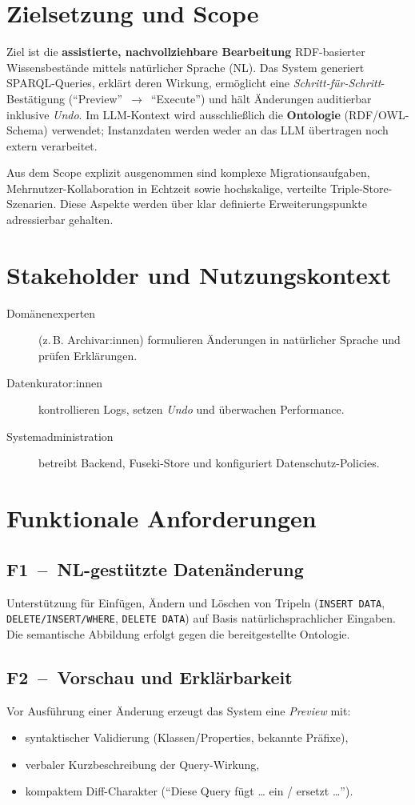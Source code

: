 \section{Zielsetzung und Scope}
Ziel ist die \textbf{assistierte, nachvollziehbare Bearbeitung} RDF-basierter Wissensbestände mittels natürlicher Sprache (NL). Das System generiert SPARQL-Queries, erklärt deren Wirkung, ermöglicht eine \emph{Schritt-für-Schritt}-Bestätigung (\enquote{Preview}~$\rightarrow$~\enquote{Execute}) und hält Änderungen auditierbar inklusive \emph{Undo}. Im LLM-Kontext wird ausschließlich die \textbf{Ontologie} (RDF/OWL-Schema) verwendet; Instanzdaten werden weder an das LLM übertragen noch extern verarbeitet.

Aus dem Scope explizit ausgenommen sind komplexe Migrationsaufgaben, Mehrnutzer-Kollaboration in Echtzeit sowie hochskalige, verteilte Triple-Store-Szenarien. Diese Aspekte werden über klar definierte Erweiterungspunkte adressierbar gehalten.

\section{Stakeholder und Nutzungskontext}
\begin{description}
  \item[Domänenexperten] (z.\,B. Archivar:innen) formulieren Änderungen in natürlicher Sprache und prüfen Erklärungen.
  \item[Datenkurator:innen] kontrollieren Logs, setzen \emph{Undo} und überwachen Performance.
  \item[Systemadministration] betreibt Backend, Fuseki-Store und konfiguriert Datenschutz-Policies.
\end{description}

\section{Funktionale Anforderungen}
\subsection*{F1~–~NL-gestützte Datenänderung}
Unterstützung für Einfügen, Ändern und Löschen von Tripeln (\texttt{INSERT DATA}, \texttt{DELETE/INSERT/WHERE}, \texttt{DELETE DATA}) auf Basis natürlichsprachlicher Eingaben. Die semantische Abbildung erfolgt gegen die bereitgestellte Ontologie.

\subsection*{F2~–~Vorschau und Erklärbarkeit}
Vor Ausführung einer Änderung erzeugt das System eine \emph{Preview} mit:
\begin{itemize}
  \item syntaktischer Validierung (Klassen/Properties, bekannte Präfixe),
  \item verbaler Kurzbeschreibung der Query-Wirkung,
  \item kompaktem Diff-Charakter (\enquote{Diese Query fügt … ein / ersetzt …}).
\end{itemize}

